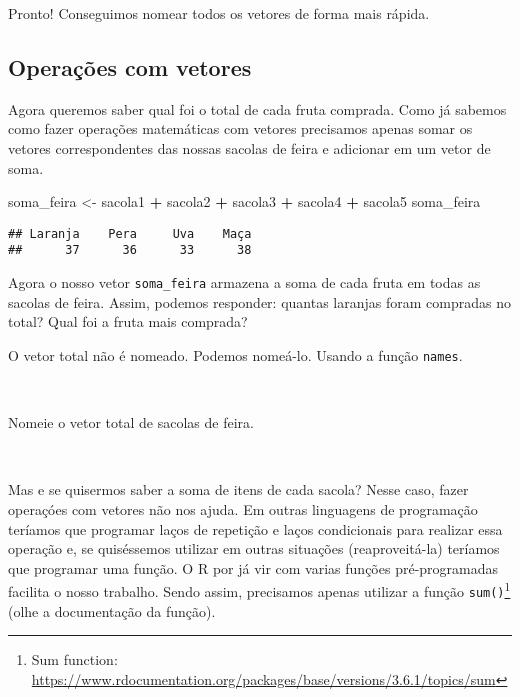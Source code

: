 \documentclass[]{book}
\newenvironment{Shaded}{\begin{snugshade}}{\end{snugshade}}
\newcommand{\NormalTok}[1]{#1}
\newcommand{\OperatorTok}[1]{\textcolor[rgb]{0.81,0.36,0.00}{\textbf{#1}}}
\newcommand{\StringTok}[1]{\textcolor[rgb]{0.31,0.60,0.02}{#1}}
\let\rmarkdownfootnote\footnote%
\def\footnote{\protect\rmarkdownfootnote}
\theoremstyle{definition}
\theoremstyle{definition}
\theoremstyle{definition}
\theoremstyle{remark}
\let\BeginKnitrBlock\begin \let\EndKnitrBlock\end
\begin{document}
Pronto! Conseguimos nomear todos os vetores de forma mais rápida.

\hypertarget{operauxe7uxf5es-com-vetores}{%
\subsection{Operações com vetores}\label{operauxe7uxf5es-com-vetores}}

Agora queremos saber qual foi o total de cada fruta comprada. Como já sabemos como fazer operações matemáticas com vetores precisamos apenas somar os vetores correspondentes das nossas sacolas de feira e adicionar em um vetor de soma.

\begin{Shaded}
\begin{Highlighting}[]
\NormalTok{soma_feira <-}\StringTok{ }\NormalTok{sacola1 }\OperatorTok{+}\StringTok{ }\NormalTok{sacola2 }\OperatorTok{+}\StringTok{ }\NormalTok{sacola3 }\OperatorTok{+}\StringTok{ }\NormalTok{sacola4 }\OperatorTok{+}\StringTok{ }\NormalTok{sacola5}
\NormalTok{soma_feira}
\end{Highlighting}
\end{Shaded}

\begin{verbatim}
## Laranja    Pera     Uva    Maça 
##      37      36      33      38
\end{verbatim}

Agora o nosso vetor \texttt{soma\_feira} armazena a soma de cada fruta em todas as sacolas de feira. Assim, podemos responder: quantas laranjas foram compradas no total? Qual foi a fruta mais comprada?

O vetor total não é nomeado. Podemos nomeá-lo. Usando a função \texttt{names}.

~
\BeginKnitrBlock{exercise}
\protect\hypertarget{exr:unnamed-chunk-30}{}{\label{exr:unnamed-chunk-30} }Nomeie o vetor total de sacolas de feira.
\EndKnitrBlock{exercise}

~

Mas e se quisermos saber a soma de itens de cada sacola? Nesse caso, fazer operaçóes com vetores não nos ajuda. Em outras linguagens de programação teríamos que programar laços de repetição e laços condicionais para realizar essa operação e, se quiséssemos utilizar em outras situações (reaproveitá-la) teríamos que programar uma função. O R por já vir com varias funções pré-programadas facilita o nosso trabalho. Sendo assim, precisamos apenas utilizar a função \texttt{sum()}\footnote{Sum function: \url{https://www.rdocumentation.org/packages/base/versions/3.6.1/topics/sum}} (olhe a documentação da função).
\end{document}
